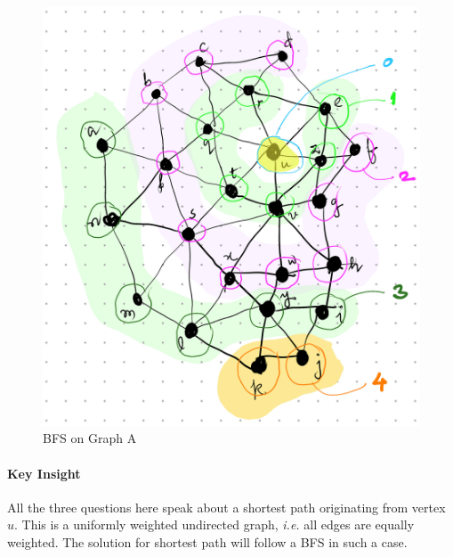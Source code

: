 \documentclass[11pt]{article}
\begin{document}
\begin{figure}[htbp]
\centering
\includegraphics[width=\linewidth]{images/bfsOnGraphA.png}
\caption{\label{fig:bfsOnGraphA}BFS on Graph A}
\end{figure}
\paragraph*{Key Insight}
\label{sec:org4e87020}
All the three questions here speak about a shortest
path originating from vertex \(u\).  This is a uniformly
weighted undirected graph, \emph{i.e.} all edges are equally
weighted.  The solution for shortest path will follow a
BFS in such a case.
\end{document}
